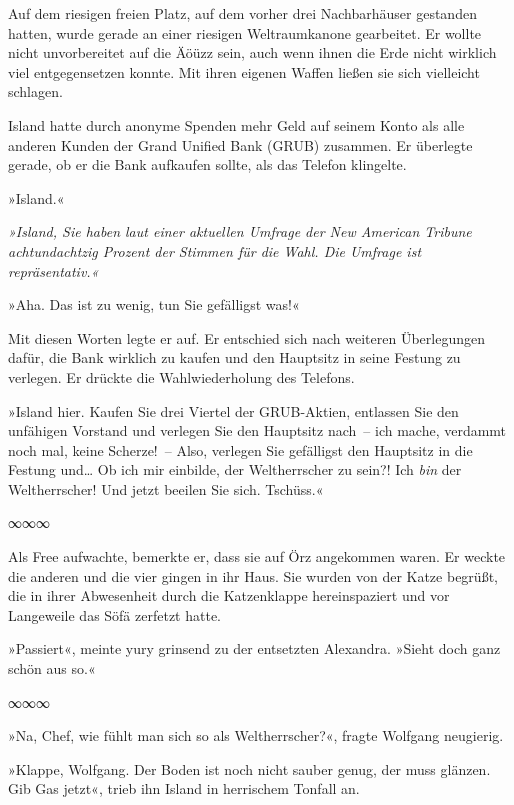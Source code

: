 Auf dem riesigen freien Platz, auf dem vorher drei Nachbarhäuser gestanden hatten, wurde gerade an einer riesigen Weltraumkanone gearbeitet. Er wollte nicht unvorbereitet auf die Äöüzz sein, auch wenn ihnen die Erde nicht wirklich viel entgegensetzen konnte. Mit ihren eigenen Waffen ließen sie sich vielleicht schlagen.

Island hatte durch anonyme Spenden mehr Geld auf seinem Konto als alle anderen Kunden der Grand Unified Bank (GRUB) zusammen. Er überlegte gerade, ob er die Bank aufkaufen sollte, als das Telefon klingelte.

»Island.«

\textit{»Island, Sie haben laut einer aktuellen Umfrage der New American Tribune achtundachtzig Prozent der Stimmen für die Wahl. Die Umfrage ist repräsentativ.«}

»Aha. Das ist zu wenig, tun Sie gefälligst was!«

Mit diesen Worten legte er auf. Er entschied sich nach weiteren Überlegungen dafür, die Bank wirklich zu kaufen und den Hauptsitz in seine Festung zu verlegen. Er drückte die Wahlwiederholung des Telefons.

»Island hier. Kaufen Sie drei Viertel der GRUB-Aktien, entlassen Sie den unfähigen Vorstand und verlegen Sie den Hauptsitz nach~– ich mache, verdammt noch mal, keine Scherze!~– Also, verlegen Sie gefälligst den Hauptsitz in die Festung und… Ob ich mir einbilde, der Weltherrscher zu sein?! Ich \textit{bin} der Weltherrscher! Und jetzt beeilen Sie sich. Tschüss.«

\begin{center}
    ∞∞∞
\end{center}

Als Free aufwachte, bemerkte er, dass sie auf Örz angekommen waren. Er weckte die anderen und die vier gingen in ihr Haus. Sie wurden von der Katze begrüßt, die in ihrer Abwesenheit durch die Katzenklappe hereinspaziert und vor Langeweile das Söfä zerfetzt hatte.

»Passiert«, meinte yury grinsend zu der entsetzten Alexandra. »Sieht doch ganz schön aus so.«

\begin{center}
    ∞∞∞
\end{center}

»Na, Chef, wie fühlt man sich so als Weltherrscher?«, fragte Wolfgang neugierig.

»Klappe, Wolfgang. Der Boden ist noch nicht sauber genug, der muss glänzen. Gib Gas jetzt«, trieb ihn Island in herrischem Tonfall an.

